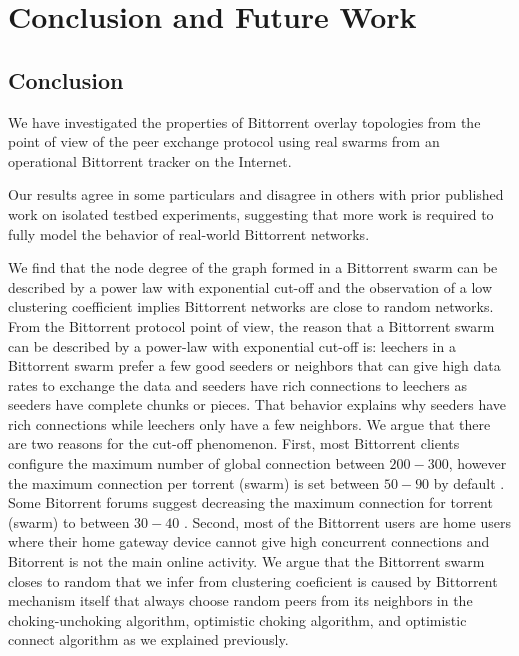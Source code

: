 \chapter{Conclusion and Future Work}

\section{Conclusion}
We have investigated the properties of Bittorrent overlay topologies from the point of view of the peer exchange protocol using real swarms from an operational Bittorrent tracker on the Internet. 

Our results agree in some particulars and disagree in others with prior published work on isolated testbed experiments, suggesting that more work is required to fully model the behavior of real-world Bittorrent networks.

We find that the node degree of the graph formed in a Bittorrent swarm can be described by a power law with exponential cut-off and the observation of a low clustering coefficient implies Bittorrent networks are close to random networks.
From the Bittorrent protocol point of view, the reason that a Bittorrent swarm can be described by a power-law with exponential cut-off is: leechers in a Bittorrent swarm prefer a few good seeders or neighbors that can give high data rates to exchange the data and seeders have rich connections to leechers as seeders have complete chunks or pieces. 
That behavior explains why seeders have rich connections while leechers only have a few neighbors. 
We argue that there are two reasons for the cut-off phenomenon. 
First, most Bittorrent clients configure the maximum number of global connection between $200-300$, however the maximum connection per torrent (swarm) is set between $50 - 90$ by default \cite{clientv}\cite{clientu}.
Some Bitorrent forums suggest decreasing the maximum connection for torrent (swarm) to between $30-40$ \cite{clientf}. 
Second, most of the Bittorrent users are home users where their home gateway device cannot give high concurrent connections and Bitorrent is not the main online activity. 
We argue that the Bittorrent swarm closes to random that we infer from clustering coeficient is caused by Bittorrent mechanism itself that always choose random peers from its neighbors in the choking-unchoking algorithm, optimistic choking algorithm, and optimistic connect algorithm as we explained previously.

